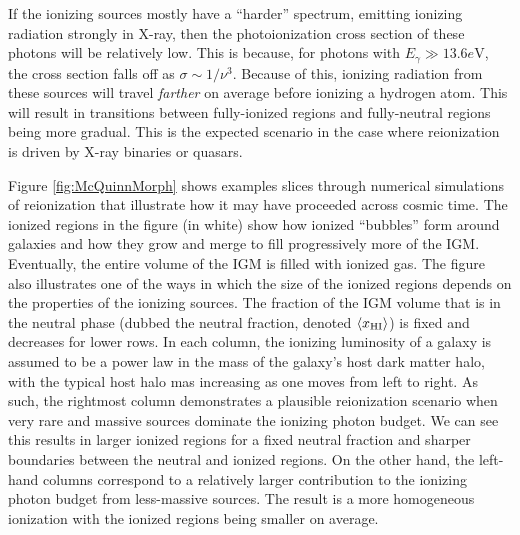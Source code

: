 If the ionizing sources mostly have a ``harder'' spectrum, emitting ionizing radiation strongly in X-ray, then the photoionization cross section of these photons will be relatively low. This is because, for photons with $E_{\gamma} \gg 13.6e\text{V}$, the cross section falls off as $\sigma \sim 1/\nu^3$. Because of this, ionizing radiation from these sources will travel \textit{farther} on average before ionizing a hydrogen atom. This will result in transitions between fully-ionized regions and fully-neutral regions being more gradual. This is the expected scenario in the case where reionization is driven by X-ray binaries or quasars. 


Figure \ref{fig:McQuinnMorph} shows examples slices through numerical simulations of reionization that illustrate how it may have proceeded across cosmic time. The ionized regions in the figure (in white) show how ionized ``bubbles'' form around galaxies and how they grow and merge to fill progressively more of the IGM. Eventually, the entire volume of the IGM is filled with ionized gas. The figure also illustrates one of the ways in which the size of the ionized regions depends on the properties of the ionizing sources. The fraction of the IGM volume that is in the neutral phase (dubbed the neutral fraction, denoted $\langle x_{\text{HI}}\rangle$) is fixed and decreases for lower rows. In each column, the ionizing luminosity of a galaxy is assumed to be a power law in the mass of the galaxy's host dark matter halo, with the typical host halo mas increasing as one moves from left to right. As such, the rightmost column demonstrates a plausible reionization scenario when very rare and massive sources dominate the ionizing photon budget. We can see this results in larger ionized regions for a fixed neutral fraction and sharper boundaries between the neutral and ionized regions. On the other hand, the left-hand columns correspond to a relatively larger contribution to the ionizing photon budget from less-massive sources. The result is a more homogeneous ionization with the ionized regions being smaller on average. 


